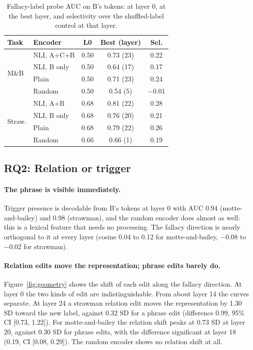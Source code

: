 \documentclass[11pt]{article}
\begin{document}
\begin{table}[t]
\centering
\small
\setlength{\tabcolsep}{4pt}
\begin{tabular}{llccc}
\toprule
Task & Encoder & L0 & Best (layer) & Sel. \\
\midrule
\multirow{4}{*}{M\&B} & NLI, A+C+B & 0.50 & 0.73 (23) & 0.22 \\
 & NLI, B only & 0.50 & 0.64 (17) & 0.17 \\
 & Plain & 0.50 & 0.71 (23) & 0.24 \\
 & Random & 0.50 & 0.54 (5) & $-$0.01 \\
\midrule
\multirow{4}{*}{Straw.} & NLI, A+B & 0.68 & 0.81 (22) & 0.28 \\
 & NLI, B only & 0.68 & 0.76 (20) & 0.21 \\
 & Plain & 0.68 & 0.79 (22) & 0.26 \\
 & Random & 0.66 & 0.66 (1) & 0.19 \\
\bottomrule
\end{tabular}
\caption{Fallacy-label probe AUC on B's tokens: at layer 0, at the best layer, and selectivity over the shuffled-label control at that layer.}
\label{tab:probe}
\end{table}

\subsection{RQ2: Relation or trigger}

\paragraph{The phrase is visible immediately.} Trigger presence is decodable from B's tokens at layer 0 with AUC 0.94 (motte-and-bailey) and 0.98 (strawman), and the random encoder does almost as well: this is a lexical feature that needs no processing. The fallacy direction is nearly orthogonal to it at every layer (cosine 0.04 to 0.12 for motte-and-bailey, $-$0.08 to $-$0.02 for strawman).

\paragraph{Relation edits move the representation; phrase edits barely do.} Figure~\ref{fig:geometry} shows the shift of each edit along the fallacy direction. At layer 0 the two kinds of edit are indistinguishable. From about layer 14 the curves separate. At layer 24 a strawman relation edit moves the representation by 1.30 SD toward the new label, against 0.32 SD for a phrase edit (difference 0.99, 95\% CI [0.73, 1.22]). For motte-and-bailey the relation shift peaks at 0.73 SD at layer 20, against 0.30 SD for phrase edits, with the difference significant at layer 18 (0.19, CI [0.08, 0.29]). The random encoder shows no relation shift at all.
\end{document}
